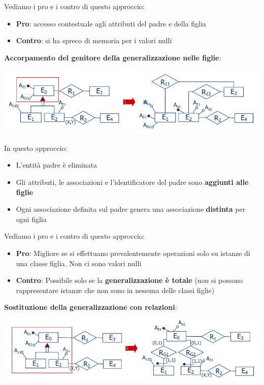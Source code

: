 \documentclass[12pt]{article}
\begin{document}
Vediamo i pro e i contro di questo approccio:
\begin{itemize}
    \item \textbf{Pro}: accesso contestuale agli attributi del padre e della figlia
    \item \textbf{Contro}: si ha spreco di memoria per i valori nulli
\end{itemize}
\textbf{Accorpamento del genitore della generalizzazione nelle figlie}: \newline
\begin{center}
    \includegraphics[width = 1\textwidth]{Images/100.PNG}
\end{center}
In questo approccio:
\begin{itemize}
    \item L'entità padre è eliminata
    \item Gli attributi, le associazioni e l'identificatore del padre sono \textbf{aggiunti alle figlie}
    \item Ogni associazione definita sul padre genera una associazione \textbf{distinta} per ogni figlia
\end{itemize}
Vediamo i pro e i contro di questo approccio:
\begin{itemize}
    \item \textbf{Pro}: Migliore se si effettuano prevalentemente operazioni solo su istanze di una classe figlia. Non ci sono valori nulli
    \item \textbf{Contro}: Possibile solo se la \textbf{generalizzazione è totale} (non si possono rappresentare istanze che non sono in nessuna delle classi figlie)
\end{itemize}
\textbf{Sostituzione della generalizzazione con relazioni}: \newline
\begin{center}
    \includegraphics[width = 1\textwidth]{Images/101.PNG}
\end{center}
\end{document}

